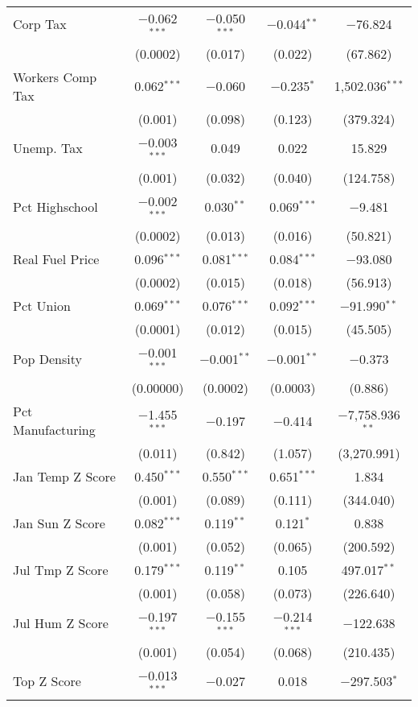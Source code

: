 \begin{table}[!htbp]
\begin{tabular}{@{\extracolsep{5pt}}lcccc}
  Corp Tax & $-$0.062$^{***}$ & $-$0.050$^{***}$ & $-$0.044$^{**}$ & $-$76.824 \\ 
  & (0.0002) & (0.017) & (0.022) & (67.862) \\ 
  Workers Comp Tax & 0.062$^{***}$ & $-$0.060 & $-$0.235$^{*}$ & 1,502.036$^{***}$ \\ 
  & (0.001) & (0.098) & (0.123) & (379.324) \\ 
  Unemp. Tax & $-$0.003$^{***}$ & 0.049 & 0.022 & 15.829 \\ 
  & (0.001) & (0.032) & (0.040) & (124.758) \\ 
  Pct Highschool & $-$0.002$^{***}$ & 0.030$^{**}$ & 0.069$^{***}$ & $-$9.481 \\ 
  & (0.0002) & (0.013) & (0.016) & (50.821) \\ 
  Real Fuel Price & 0.096$^{***}$ & 0.081$^{***}$ & 0.084$^{***}$ & $-$93.080 \\ 
  & (0.0002) & (0.015) & (0.018) & (56.913) \\ 
  Pct Union & 0.069$^{***}$ & 0.076$^{***}$ & 0.092$^{***}$ & $-$91.990$^{**}$ \\ 
  & (0.0001) & (0.012) & (0.015) & (45.505) \\ 
  Pop Density & $-$0.001$^{***}$ & $-$0.001$^{**}$ & $-$0.001$^{**}$ & $-$0.373 \\ 
  & (0.00000) & (0.0002) & (0.0003) & (0.886) \\ 
  Pct Manufacturing & $-$1.455$^{***}$ & $-$0.197 & $-$0.414 & $-$7,758.936$^{**}$ \\ 
  & (0.011) & (0.842) & (1.057) & (3,270.991) \\ 
  Jan Temp Z Score & 0.450$^{***}$ & 0.550$^{***}$ & 0.651$^{***}$ & 1.834 \\ 
  & (0.001) & (0.089) & (0.111) & (344.040) \\ 
  Jan Sun Z Score & 0.082$^{***}$ & 0.119$^{**}$ & 0.121$^{*}$ & 0.838 \\ 
  & (0.001) & (0.052) & (0.065) & (200.592) \\ 
  Jul Tmp Z Score & 0.179$^{***}$ & 0.119$^{**}$ & 0.105 & 497.017$^{**}$ \\ 
  & (0.001) & (0.058) & (0.073) & (226.640) \\ 
  Jul Hum Z Score & $-$0.197$^{***}$ & $-$0.155$^{***}$ & $-$0.214$^{***}$ & $-$122.638 \\ 
  & (0.001) & (0.054) & (0.068) & (210.435) \\ 
  Top Z Score & $-$0.013$^{***}$ & $-$0.027 & 0.018 & $-$297.503$^{*}$ \\ 

\end{tabular}
\end{table}
